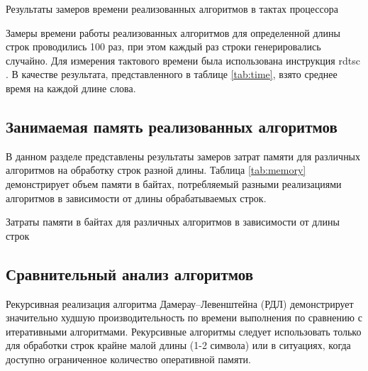 \begin{table}[hbtp]
	\centering
	\caption{Результаты замеров времени реализованных алгоритмов в тактах процессора}
	\label{tab:time}
\end{table}

Замеры времени работы реализованных алгоритмов для определенной длины строк проводились 100 раз, при этом каждый раз строки генерировались случайно. 
Для измерения тактового времени была использована инструкция rdtsc \cite{microsoft_rdtsc}.
В качестве результата, представленного в таблице \ref{tab:time}, взято среднее время на каждой длине слова.

\pagebreak
\newpage

\subsection{Занимаемая память реализованных алгоритмов}

В данном разделе представлены результаты замеров затрат памяти для различных алгоритмов на обработку строк разной длины. Таблица \ref{tab:memory} демонстрирует объем памяти в байтах, потребляемый разными реализациями алгоритмов в зависимости от длины обрабатываемых строк.

\begin{table}[ht]
	\centering
	\caption{Затраты памяти в байтах для различных алгоритмов в зависимости от длины строк}
	\label{tab:memory}
\end{table}

\subsection{Сравнительный анализ алгоритмов}

	Рекурсивная реализация алгоритма Дамерау--Левенштейна (РДЛ) демонстрирует значительно худшую производительность по времени выполнения по сравнению с итеративными алгоритмами. 
	Рекурсивные алгоритмы следует использовать только для обработки строк крайне малой длины (1-2 символа) или в ситуациях, когда доступно ограниченное количество оперативной памяти.
	
